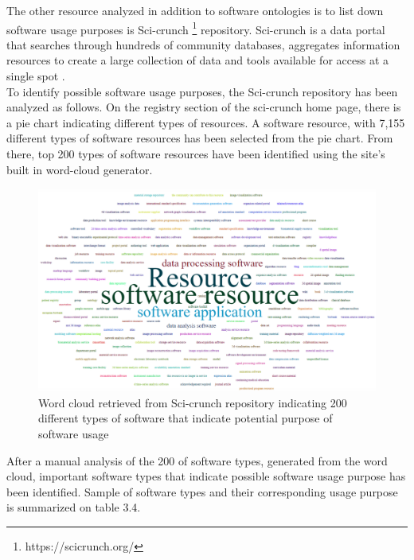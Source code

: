 The other resource analyzed in addition to software ontologies is to list down software usage purposes is Sci-crunch \footnote{https://scicrunch.org/} repository. Sci-crunch is a data portal that searches through hundreds of community databases, aggregates information resources to create a large collection of data and tools available for access at a single spot \citep{grethe2016scicrunch}. \\

To identify possible software usage purposes, the Sci-crunch repository has been analyzed as follows. On the registry section of the sci-crunch home page, there is a pie chart indicating different types of resources. A software resource, with  7,155 different types of software resources has been selected from the pie chart. From there, top 200 types of software resources have been identified using the site’s built in word-cloud generator. \\
 

\begin{figure}[htbp]
	\centering
	\includegraphics[width=.75\textwidth]{4.graphics/figures/cloud}
	\caption{Word cloud retrieved from Sci-crunch repository indicating 200 different types of software that  indicate potential purpose of software usage}
	\label{fig:chapter03:setup}
\end{figure}

After a manual analysis of the 200 of software types, generated from the word cloud, important software types that indicate possible software usage purpose has been identified. Sample of software types and their corresponding usage purpose is summarized on table 3.4.

